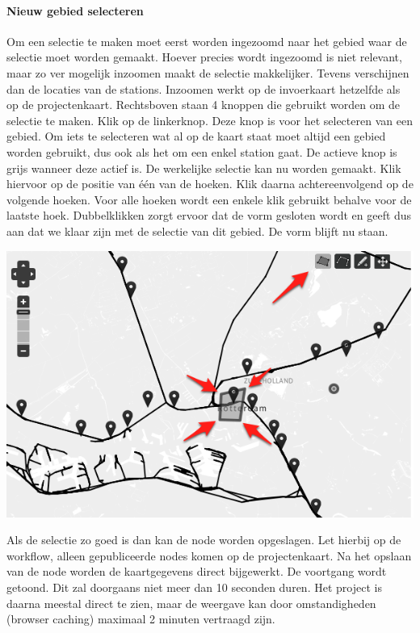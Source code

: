 \paragraph{Nieuw gebied selecteren}
Om een selectie te maken moet eerst worden ingezoomd naar het gebied waar de selectie moet worden gemaakt. Hoever precies wordt ingezoomd is niet relevant, maar zo ver mogelijk inzoomen maakt de selectie makkelijker. Tevens verschijnen dan de locaties van de stations. Inzoomen werkt op de invoerkaart hetzelfde als op de projectenkaart. Rechtsboven staan 4 knoppen die gebruikt worden om de selectie te maken. Klik op de linkerknop. Deze knop is voor het selecteren van een gebied. Om iets te selecteren wat al op de kaart staat moet altijd een gebied worden gebruikt, dus ook als het om een enkel station gaat.
De actieve knop is grijs wanneer deze actief is. De werkelijke selectie kan nu worden gemaakt. Klik hiervoor op de positie van \'{e}\'{e}n van de hoeken. Klik daarna achtereenvolgend op de volgende hoeken. Voor alle hoeken wordt een enkele klik gebruikt behalve voor de laatste hoek. Dubbelklikken zorgt ervoor dat de vorm gesloten wordt en geeft dus aan dat we klaar zijn met de selectie van dit gebied. De vorm blijft nu staan.
\begin{center}
\includegraphics[scale=.7]{img/kaart3.png}
\end{center}
Als de selectie zo goed is dan kan de node worden opgeslagen. Let hierbij op de workflow, alleen gepubliceerde nodes komen op de projectenkaart. Na het opslaan van de node worden de kaartgegevens direct bijgewerkt. De voortgang wordt getoond. Dit zal doorgaans niet meer dan 10 seconden duren. Het project is daarna meestal direct te zien, maar de weergave kan door omstandigheden (browser caching) maximaal 2 minuten vertraagd zijn.
